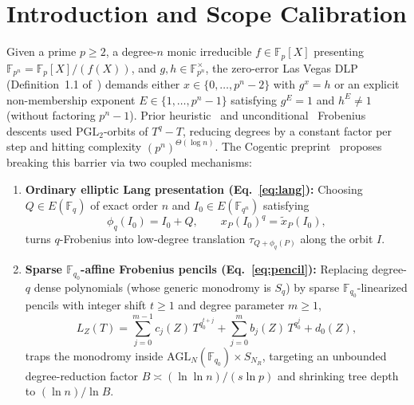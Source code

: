 \documentclass[10pt,twocolumn]{article}
\newcommand{\FF}{\mathbb{F}}
\begin{document}
\section{Introduction and Scope Calibration}\label{sec:intro}
Given a prime $p\ge 2$, a degree-$n$ monic irreducible $f\in\FF_p[X]$ presenting $\FF_{p^n}=\FF_p[X]/(f(X))$, and $g,h\in\FF_{p^n}^\times$, the zero-error Las Vegas DLP (Definition~1.1 of~\cite{cogentic2026dlp}) demands either $x\in\{0,\dots,p^n-2\}$ with $g^x=h$ or an explicit non-membership exponent $E\in\{1,\dots,p^n-1\}$ satisfying $g^E=1$ and $h^E\ne 1$ (without factoring $p^n-1$). Prior heuristic~\cite{barbulescu2014heuristic} and unconditional~\cite{kleinjung2022discrete,lido2026provably} Frobenius descents used $\mathrm{PGL}_2$-orbits of $T^q-T$, reducing degrees by a constant factor per step and hitting complexity $(p^n)^{\Theta(\log n)}$. The Cogentic preprint~\cite{cogentic2026dlp,cai2026cogentic} proposes breaking this barrier via two coupled mechanisms:
\begin{enumerate}[leftmargin=1.2em,itemsep=1pt,topsep=2pt]
  \item \textbf{Ordinary elliptic Lang presentation (Eq.~\eqref{eq:lang}):} Choosing $Q\in E(\FF_q)$ of exact order $n$ and $I_0\in E(\FF_{q^n})$ satisfying
  \begin{equation}
  \phi_q(I_0) = I_0 + Q, \qquad x_P(I_0)^q = \tilde{x}_P(I_0),
  \tag{1}\label{eq:lang}
  \end{equation}
  turns $q$-Frobenius into low-degree translation $\tau_{Q+\phi_q(P)}$ along the orbit $I$.
  \item \textbf{Sparse $\FF_{q_0}$-affine Frobenius pencils (Eq.~\eqref{eq:pencil}):} Replacing degree-$q$ dense polynomials (whose generic monodromy is $S_q$) by sparse $\FF_{q_0}$-linearized pencils with integer shift $t\ge 1$ and degree parameter $m\ge 1$,
  \begin{equation}
  L_Z(T) = \sum_{j=0}^{m-1} c_j(Z)\,T^{q_0^{t+j}} + \sum_{j=0}^{m} b_j(Z)\,T^{q_0^j} + d_0(Z),
  \tag{2}\label{eq:pencil}
  \end{equation}
  traps the monodromy inside $\mathrm{AGL}_N(\FF_{q_0})\times S_{N_R}$, targeting an unbounded degree-reduction factor $B \asymp (\ln\ln n)/(s\ln p)$ and shrinking tree depth to $(\ln n)/\ln B$.
\end{enumerate}
\end{document}
